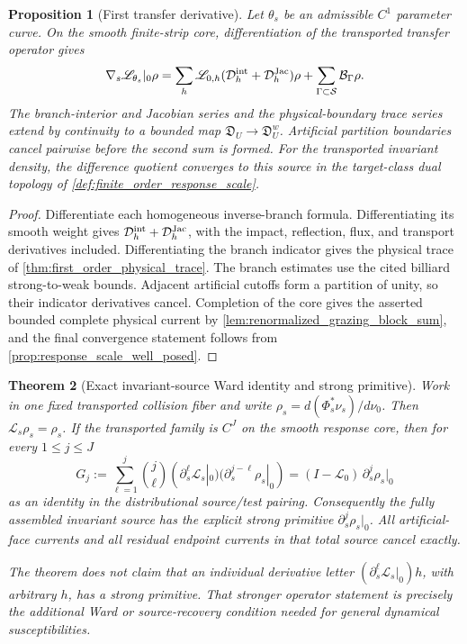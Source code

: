 \documentclass[11pt]{amsart}
\theoremstyle{compactplain}
\newtheorem{theorem}{Theorem}[section]
\newtheorem{proposition}[theorem]{Proposition}
\theoremstyle{compactdefinition}
\theoremstyle{compactremark}
\newcommand{\Ltransfer}{\mathscr L}
\newcommand{\Ssing}{\mathcal S}
\begin{document}
\begin{proposition}[First transfer derivative]
\label{prop:first_transfer_derivative}
Let \(\theta_s\) be an admissible \(C^1\) parameter curve.  On the smooth
finite-strip core, differentiation of the transported transfer operator gives
\[
  \nabla_s\Ltransfer_{\theta_s}|_0\rho
  =\sum_h\Ltransfer_{0,h}
    (\mathcal D_h^{\rm int}+\mathcal D_h^{\rm Jac})\rho
   +\sum_{\Gamma\subset\Ssing}\mathcal B_\Gamma\rho .
\]
The branch-interior and Jacobian series and the physical-boundary trace series
extend by continuity to a bounded map
\(\mathfrak D_U\to\mathfrak D_U^w\).  Artificial partition boundaries cancel
pairwise before the second sum is formed.  For the transported invariant
density, the difference quotient converges to this source in the target-class
dual topology of \cref{def:finite_order_response_scale}.
\end{proposition}

\begin{proof}
Differentiate each homogeneous inverse-branch formula.  Differentiating its
smooth weight gives \(\mathcal D_h^{\rm int}+\mathcal D_h^{\rm Jac}\), with the
impact, reflection, flux, and transport derivatives included.  Differentiating
the branch indicator gives the physical trace of
\cref{thm:first_order_physical_trace}.  The branch estimates use the cited
billiard strong-to-weak bounds.  Adjacent artificial cutoffs form a partition
of unity, so their
indicator derivatives cancel.  Completion of the core gives the asserted
bounded complete physical current by
\cref{lem:renormalized_grazing_block_sum}, and the final convergence statement follows from
\cref{prop:response_scale_well_posed}.
\end{proof}

\begin{theorem}[Exact invariant-source Ward identity and strong primitive]
\label{thm:invariant_source_ward_identity}
Work in one fixed transported collision fiber and write
\(\rho_s=d(\Phi_s^*\nu_s)/d\nu_0\).  Then
\(\Ltransfer_s\rho_s=\rho_s\).  If the transported family is \(C^J\) on the
smooth response core, then for every \(1\le j\le J\)
\begin{equation}
\label{eq:invariant_source_ward_identity}
 G_j:=\sum_{\ell=1}^{j}\binom j\ell
   (\partial_s^\ell\Ltransfer_s|_0)
   (\partial_s^{j-\ell}\rho_s|_0)
   =(I-\Ltransfer_0)\,\partial_s^j\rho_s|_0
\end{equation}
as an identity in the distributional source/test pairing.  Consequently the
\emph{fully assembled invariant source} has the explicit strong primitive
\(\partial_s^j\rho_s|_0\).  All artificial-face currents and all residual
endpoint currents in that total source cancel exactly.

The theorem does not claim that an individual derivative letter
\((\partial_s^\ell\Ltransfer_s|_0)h\), with arbitrary \(h\), has a strong
primitive.  That stronger operator statement is precisely the additional Ward
or source-recovery condition needed for general dynamical susceptibilities.
\end{theorem}
\end{document}
